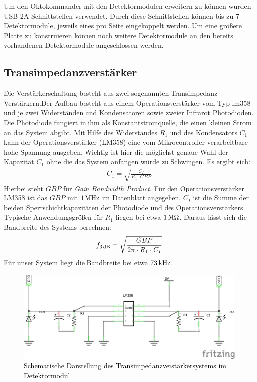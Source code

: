 Um den Oktokommander mit den Detektormodulen erweitern zu können wurden USB-2A Schnittstellen verwendet. Durch diese Schnittstellen können bis zu 7 Detektormodule, jeweils eines pro Seite  eingekoppelt werden. Um eine größere Platte zu konstruieren können noch weitere Detektormodule an den bereits vorhandenen Detektormodule angeschlossen werden.




\subsection{Transimpedanzverstärker}
\label{subsec:Transimpedanzverstärker}

Die Verstärkerschaltung besteht aus zwei sogenannten Transimpedanz Verstärkern.Der Aufbau besteht aus einem Operationsverstärker vom Typ lm358 und je zwei Widerständen und Kondensatoren sowie zweier Infrarot Photodioden.  Die Photodiode fungiert in ihm als Konstantstromquelle, die einen kleinen Strom an das System abgibt. Mit Hilfe des Widerstandes $R_1$ und des Kondensators $C_1$ kann der Operationsverstärker (LM358) eine vom Mikrocontroller verarbeitbare hohe Spannung ausgeben. Wichtig ist hier die möglichst genaue Wahl der Kapazität $C_1$ ohne die das System anfangen würde zu Schwingen. Es ergibt sich:
\begin{align*}
	C_1 = \sqrt{\frac{C_I}{R_1 \cdot GBP}}
\end{align*}
Hierbei steht $GBP$ für \textit{Gain Bandwidth Product}. Für den Operationsverstärker LM358 ist das $GBP$ mit $\unit[1]{MHz}$ im Datenblatt angegeben. $C_I$ ist die Summe der beiden Sperrschichtkapazitäten der Photodiode und des Operationsverstärkers. Typische Anwendungsgrößen für $R_1$ liegen bei etwa $\unit[1]{M\Omega}$. Daraus lässt sich die Bandbreite des Systems berechnen:
\begin{align*}
	f_{\unit[3]{dB}} = \sqrt{\frac{GBP}{2\pi \cdot R_1 \cdot C_I}}
\end{align*}
Für unser System liegt die Bandbreite bei etwa $\unit[73]{kHz}$. 

\begin{figure}[h]
	\centering
	\includegraphics[scale=1]{../figures/Transimpedanz.png}
	\caption{\textcolor{black}{Schematische Darstellung des Transimpedanzverstärkersystems im Detektormodul}}
	\label{fig:Transimpedanz}
\end{figure}

